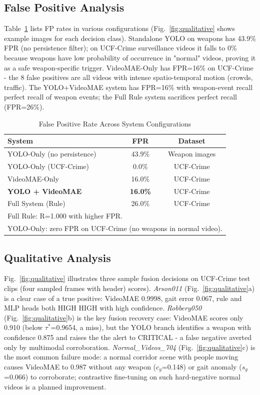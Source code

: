 \documentclass[conference]{IEEEtran}
\begin{document}
\subsection{False Positive Analysis}

Table~\ref{tab:fp} lists FP rates in various configurations
(Fig.~\ref{fig:qualitative} shows example images for each decision class).
Standalone YOLO on weapons has 43.9\% FPR (no persistence filter);
on UCF-Crime surveillance videos it falls to 0\% because weapons
have low probability of occurrence in "normal" videos, proving it as a safe
weapon-specific trigger.
VideoMAE-Only has FPR=16\% on UCF-Crime - the 8 false positives
are all videos with intense spatio-temporal motion (crowds, traffic).
The YOLO+VideoMAE system has FPR=16\% with weapon-event recall
perfect recall of weapon events; the Full Rule system sacrifices
perfect recall (FPR=26\%).

\begin{table}[h]
\caption{False Positive Rate Across System Configurations}
\label{tab:fp}
\centering
\begin{tabular}{lcc}
\toprule
\textbf{System} & \textbf{FPR} & \textbf{Dataset}\\
\midrule
YOLO-Only (no persistence) & 43.9\% & Weapon images\\
YOLO-Only (UCF-Crime)      &  0.0\% & UCF-Crime\\
VideoMAE-Only              & 16.0\% & UCF-Crime\\
\textbf{YOLO + VideoMAE}   & \textbf{16.0\%} & UCF-Crime\\
Full System (Rule)         & 26.0\% & UCF-Crime\\
\bottomrule
\multicolumn{3}{l}{\footnotesize Full Rule: R=1.000 with higher FPR.}\\
\multicolumn{3}{l}{\footnotesize YOLO-Only: zero FPR on UCF-Crime (no weapons in normal video).}
\end{tabular}
\end{table}

\subsection{Qualitative Analysis}

Fig.~\ref{fig:qualitative} illustrates three sample fusion decisions on
UCF-Crime test clips (four sampled frames with header)
scores).
\emph{Arson011} (Fig.~\ref{fig:qualitative}a) is a clear case of a true positive:
VideoMAE 0.9998, gait error 0.067, rule and MLP heads both HIGH
HIGH with high confidence.
\emph{Robbery050} (Fig.~\ref{fig:qualitative}b) is the key fusion
recovery case: VideoMAE scores only 0.910 (below $\tau^*$=0.9654, a miss),
but the YOLO branch identifies a weapon with confidence 0.875 and raises the
the alert to CRITICAL - a false negative averted only by multimodal
corroboration.
\emph{Normal\_Videos\_704} (Fig.~\ref{fig:qualitative}c) is the most common
failure mode: a normal corridor scene with people moving causes VideoMAE to
0.987 without any weapon ($c_y$=0.148) or gait anomaly ($s_g$=0.066) to
corroborate; contrastive fine-tuning on such hard-negative normal videos is a
planned improvement.    
\end{document}

